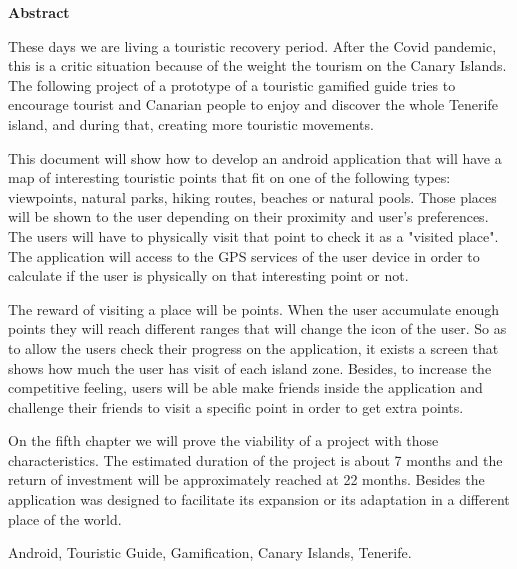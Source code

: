 \documentclass[spanish,a4paper,12pt,oneside]{extreport}
\newenvironment{summary}
{\par\noindent\begin{center}\textbf{Abstract}\end{center}\begin{itshape}\par\noindent}
{\end{itshape}}
\newenvironment{keywords}
{\begin{list}{}{\setlength{\leftmargin}{1em}}\item[\hskip\labelsep \bfseries Keywords:]}
{\end{list}}
\begin{document}
\begin{summary}
{
These days we are living a touristic recovery period. After the Covid pandemic, this is a critic situation because of the weight the tourism on the Canary Islands. The following project of a prototype of a touristic gamified guide tries to encourage tourist and Canarian people to enjoy and discover the whole Tenerife island, and during that, creating more touristic movements.

This document will show how to develop an android application that will have a map of interesting touristic points that fit on one of the following types: viewpoints, natural parks, hiking routes, beaches or natural pools. Those places will be shown to the user depending on their proximity and user's preferences. The users will have to physically visit that point to check it as a "visited place". The application will access to the GPS services of the user device in order to calculate if the user is physically on that interesting point or not.

The reward of visiting a place will be points. When the user accumulate enough points they will reach different ranges that will change the icon of the user. So as to allow the users check their progress on the application, it exists a screen that shows how much the user has visit of each island zone. Besides, to increase the competitive feeling, users will be able make friends inside the application and challenge their friends to visit a specific point in order to get extra points.

On the fifth chapter we will prove the viability of a project with those characteristics. The estimated duration of the project is about 7 months and the return of investment will be approximately reached at 22 months. Besides the application was designed to facilitate its expansion or its adaptation in a different place of the world.
}

\em
\begin {keywords}
Android, Touristic Guide, Gamification, Canary Islands, Tenerife.
\end {keywords}

\end{summary}
\newpage{\pagestyle{empty}}
\thispagestyle{empty}

\pagestyle{myheadings} %
\end{document}
